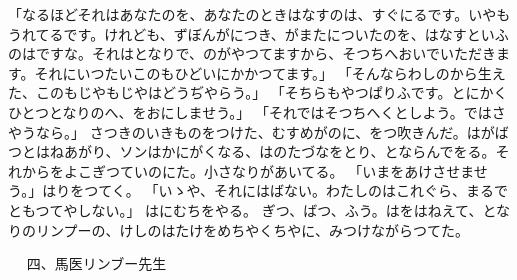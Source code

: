 \documentclass[a4paper,
tate,
book]
{jlreq}
\begin{document}
「なるほどそれはあなたのを、あなたのときはなすのは、すぐにるです。いやもうれてるです。けれども、ずぼんがにつき、がまたについたのを、はなすといふのはですな。それはとなりで、のがやつてますから、そつちへおいでいただきます。それにいつたいこのもひどいにかかつてます。」
「そんならわしのから生えた、このもじやもじやはどうぢやらう。」
「そちらもやつぱりふです。とにかくひとつとなりのへ、をおにしませう。」
「それではそつちへくとしよう。ではさやうなら。」
  さつきのいきものをつけた、むすめがのに、をつ吹きんだ。はがばつとはねあがり、ソンはかにがくなる、はのたづなをとり、とならんでをる。それからをよこぎつていのにた。小さなりがあいてる。
「いまをあけさせませう。」はりをつてく。
「いゝや、それにはばない。わたしのはこれぐら、まるでともつてやしない。」
  はにむちをやる。
  ぎつ、ばつ、ふう。はをはねえて、となりのリンプーの、けしのはたけをめちやくちやに、みつけながらつてた。

 
            四、馬医リンブー先生
\end{document}

